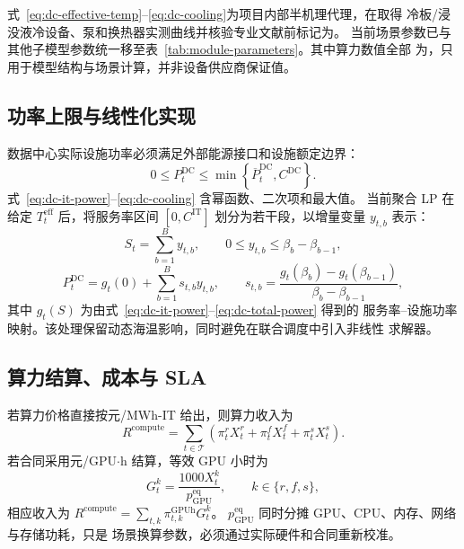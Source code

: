 式~\eqref{eq:dc-effective-temp}--\eqref{eq:dc-cooling}为项目内部半机理代理，在取得
冷板/浸没液冷设备、泵和换热器实测曲线并核验专业文献前标记为\verifytag。
当前场景参数已与其他子模型参数统一移至表~\ref{tab:module-parameters}。其中算力数值全部
为\assumptiontag，只用于模型结构与场景计算，并非设备供应商保证值。

\subsection{功率上限与线性化实现}

数据中心实际设施功率必须满足外部能源接口和设施额定边界：
\begin{equation}
0\le P_t^{\mathrm{DC}}
\le \min\left\{\overline P_t^{\mathrm{DC}},C^{\mathrm{DC}}\right\}.
\label{eq:dc-power-cap}
\end{equation}
式~\eqref{eq:dc-it-power}--\eqref{eq:dc-cooling} 含幂函数、二次项和最大值。
当前聚合 LP 在给定 $T_t^{\mathrm{eff}}$ 后，将服务率区间
$[0,C^{\mathrm{IT}}]$ 划分为若干段，以增量变量 $y_{t,b}$ 表示：
\begin{equation}
S_t=\sum_{b=1}^{B}y_{t,b},
\qquad 0\le y_{t,b}\le \beta_b-\beta_{b-1},
\end{equation}
\begin{equation}
P_t^{\mathrm{DC}}
=g_t(0)+\sum_{b=1}^{B}s_{t,b}y_{t,b},
\qquad
s_{t,b}=\frac{g_t(\beta_b)-g_t(\beta_{b-1})}
{\beta_b-\beta_{b-1}},
\label{eq:dc-piecewise}
\end{equation}
其中 $g_t(S)$ 为由式~\eqref{eq:dc-it-power}--\eqref{eq:dc-total-power} 得到的
服务率--设施功率映射。该处理保留动态海温影响，同时避免在联合调度中引入非线性
求解器。

\subsection{算力结算、成本与 SLA}

若算力价格直接按元/MWh-IT 给出，则算力收入为
\begin{equation}
R^{\mathrm{compute}}
=\sum_{t\in\mathcal T}
\left(\pi_t^rX_t^r+\pi_t^fX_t^f+\pi_t^sX_t^s\right).
\label{eq:dc-revenue-mwhit}
\end{equation}
若合同采用元/GPU$\cdot$h 结算，等效 GPU 小时为
\begin{equation}
G_t^k=\frac{1000X_t^k}{p_{\mathrm{GPU}}^{\mathrm{eq}}},
\qquad k\in\{r,f,s\},
\label{eq:dc-gpuh}
\end{equation}
相应收入为 $R^{\mathrm{compute}}=\sum_{t,k}\pi_{t,k}^{\mathrm{GPUh}}G_t^k$。
$p_{\mathrm{GPU}}^{\mathrm{eq}}$ 同时分摊 GPU、CPU、内存、网络与存储功耗，只是
场景换算参数，必须通过实际硬件和合同重新校准。

